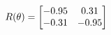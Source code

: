 \documentclass[preview]{standalone}
\begin{document}
\begin{align*}
\special{dvisvgm:raw <g id='unique000'>}R(\theta) = \begin{bmatrix}-0.95 & 0.31\\-0.31 & -0.95\end{bmatrix}\special{dvisvgm:raw </g>}
\end{align*}
\end{document}
